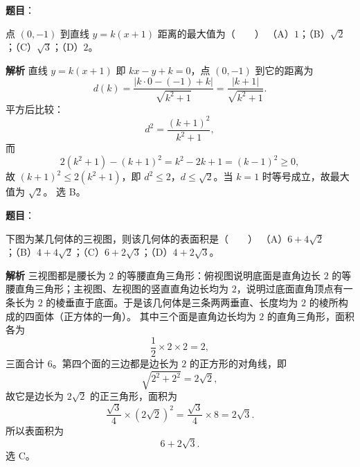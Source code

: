 \begin{answer}

\textbf{题目}：

点 $(0,-1)$ 到直线 $y=k(x+1)$ 距离的最大值为\mbox{（　　）}
（A）$1$；（B）$\sqrt2$；（C）$\sqrt3$；（D）$2$。

\textbf{解析}
直线 $y=k(x+1)$ 即 $kx-y+k=0$，点 $(0,-1)$ 到它的距离为
\nopagebreak[4]
\[d(k)=\frac{|k\cdot0-(-1)+k|}{\sqrt{k^2+1}}=\frac{|k+1|}{\sqrt{k^2+1}} .\]
平方后比较：
\nopagebreak[4]
\[d^2=\frac{(k+1)^2}{k^2+1},\]
而
\nopagebreak[4]
\[2(k^2+1)-(k+1)^2=k^2-2k+1=(k-1)^2\geqslant0,\]
故 $(k+1)^2\leqslant2(k^2+1)$，即 $d^2\leqslant2$，$d\leqslant\sqrt2$。当 $k=1$ 时等号成立，故最大值为 $\sqrt2$。
选 B。


\end{answer}
\begin{answer}

\textbf{题目}：

下图为某几何体的三视图，则该几何体的表面积是\mbox{（　　）}
（A）$6+4\sqrt2$；（B）$4+4\sqrt2$；（C）$6+2\sqrt3$；（D）$4+2\sqrt3$。
\nopagebreak[4]
\begin{center}\end{center}
\nopagebreak[4]
\textbf{解析}
三视图都是腰长为 $2$ 的等腰直角三角形：俯视图说明底面是直角边长 $2$ 的等腰直角三角形；主视图、左视图的竖直直角边长均为 $2$，说明过底面直角顶点有一条长为 $2$ 的棱垂直于底面。于是该几何体是三条两两垂直、长度均为 $2$ 的棱所构成的四面体（正方体的一角）。
其中三个面是直角边长均为 $2$ 的直角三角形，面积各为
\nopagebreak[4]
\[\frac12\times2\times2=2,\]
三面合计 $6$。第四个面的三边都是边长为 $2$ 的正方形的对角线，即
\nopagebreak[4]
\[\sqrt{2^2+2^2}=2\sqrt2,\]
故它是边长为 $2\sqrt2$ 的正三角形，面积为
\nopagebreak[4]
\[\frac{\sqrt3}4\times(2\sqrt2)^2=\frac{\sqrt3}4\times8=2\sqrt3 .\]
所以表面积为
\nopagebreak[4]
\[6+2\sqrt3 .\]
选 C。


\end{answer}
